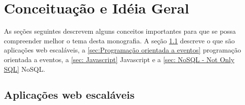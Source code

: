 \chapter{Conceituação e Idéia Geral}
\label{cha: Conceituação e Idéia Geral}

As seções seguintes descrevem alguns conceitos importantes para que se possa compreender melhor o tema desta monografia. A seção  \ref{sec: Aplicações web escaláveis} descreve o que são aplicações web escaláveis, a \ref{sec:Programação orientada a eventos} programação orientada a eventos, a \ref{sec: Javascript} Javascript e a  \ref{sec: NoSQL - Not Only SQL} NoSQL.


\section{Aplicações web escaláveis}
\label{sec: Aplicações web escaláveis}
